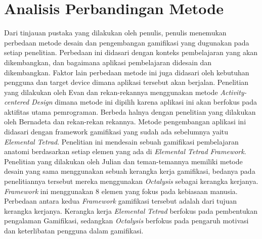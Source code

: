 \section{Analisis Perbandingan Metode}
Dari tinjauan pustaka yang dilakukan oleh penulis, penulis menemukan perbedaan metode desain dan pengembangan gamifikasi yang dugunakan pada setiap penelitian.
Perbedaan ini didasari dengan konteks pembelajaran yang akan dikembangkan, dan bagaimana aplikasi pembelajaran didesain dan dikembangkan.
Faktor lain perbedaan metode ini juga didasari oleh kebutuhan pengguna dan target device dimana aplikasi tersebut akan berjalan.
Penelitian yang dilakukan oleh Evan dan rekan-rekannya menggunakan metode \textit{Activity-centered Design} dimana metode ini dipilih karena aplikasi ini akan berfokus pada aktifitas utama pemrograman.
Berbeda halnya dengan penelitian yang dilakukan oleh Bernadeta dan rekan-rekan rekannya. Metode pengembangan aplikasi ini didasari dengan framework gamifikasi yang sudah ada sebelumnya yaitu \textit{Elemental Tetrad}.
Penelitian ini mendesain sebuah gamifikasi pembelajaran anatomi berdasarkan setiap elemen yang ada di \textit{Elemental Tetrad Framework}.
Penelitian yang dilakukan oleh Julian dan teman-temannya memiliki metode desain yang sama menggunakan sebuah kerangka kerja gamifikasi, 
bedanya  pada penelitiannya tersebut mereka menggunakan \textit{Octalysis} sebagai kerangka kerjanya. \textit{Framework} ini menggunakan 8 elemen yang fokus pada kebiasaan manusia.
Perbedaan antara kedua \textit{Framework} gamifikasi tersebut adalah dari tujuan kerangka kerjanya. Kerangka kerja \textit{Elemental Tetrad} berfokus pada pembentukan pengalaman Gamifikasi,
sedangkan \textit{Octalysis} berfokus pada pengaruh motivasi dan keterlibatan pengguna dalam gamifikasi.
\newpage
